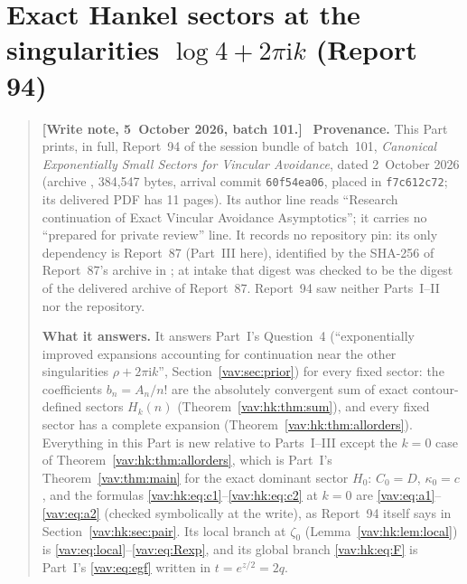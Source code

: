 \documentclass[11pt]{article}
\theoremstyle{remark}\newtheorem{remark}[theorem]{Remark}
\newcommand{\ii}{\mathrm i}
\newenvironment{writenoteb}{\begin{quote}\small\raggedright\textbf{[Write note, 5~October 2026, batch 101.]}\ }{\end{quote}}
\begin{document}
\part{Exact Hankel sectors at the singularities \texorpdfstring{$\log4+2\pi\ii k$}{log 4 + 2 pi i k} (Report 94)}
\label{vav:hk:part}
\begin{writenoteb}
\textbf{Provenance.} This Part prints, in full, Report~94 of the session
bundle of batch~101, \emph{Canonical Exponentially Small Sectors for
Vincular Avoidance}, dated 2~October 2026 (archive
, 384{,}547 bytes,
arrival commit \texttt{60f54ea06}, placed in \texttt{f7c612c72}; its
delivered PDF has 11 pages). Its author line reads ``Research continuation
of Exact Vincular Avoidance Asymptotics''; it carries no ``prepared for
private review'' line. It records no repository pin: its only dependency
is Report~87 (Part~III here), identified by the SHA-256 of Report~87's
archive in ; at intake that digest
was checked to be the digest of the delivered archive of Report~87. Report~94
saw neither Parts~I--II nor the repository.

\textbf{What it answers.} It answers Part~I's Question~4 (``exponentially
improved expansions accounting for continuation near the other singularities
$\rho+2\pi\ii k$'', Section~\ref{vav:sec:prior}) for every fixed sector:
the coefficients $b_n=A_n/n!$ are the absolutely convergent sum of exact
contour-defined sectors $H_k(n)$ (Theorem~\ref{vav:hk:thm:sum}), and every
fixed sector has a complete expansion (Theorem~\ref{vav:hk:thm:allorders}).
Everything in this Part is new relative to Parts~I--III except the $k=0$
case of Theorem~\ref{vav:hk:thm:allorders}, which is Part~I's
Theorem~\ref{vav:thm:main} for the exact dominant sector $H_0$: $C_0=D$,
$\kappa_0=c$, and the formulas \eqref{vav:hk:eq:c1}--\eqref{vav:hk:eq:c2}
at $k=0$ are \eqref{vav:eq:a1}--\eqref{vav:eq:a2} (checked symbolically at
the write), as Report~94 itself says in Section~\ref{vav:hk:sec:pair}. Its
local branch at $\zeta_0$ (Lemma~\ref{vav:hk:lem:local}) is
\eqref{vav:eq:local}--\eqref{vav:eq:Rexp}, and its global branch
\eqref{vav:hk:eq:F} is Part~I's \eqref{vav:eq:egf} written in $t=e^{z/2}=2q$.


\end{writenoteb}
\end{document}
